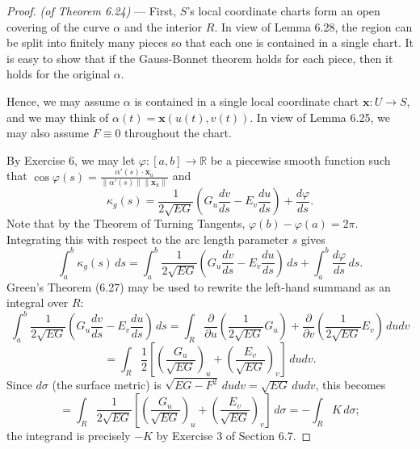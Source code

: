 \documentclass[leqno]{book}
\begin{document}
\begin{proof}
\emph{(of Theorem 6.24)} \---- First, $S$'s local coordinate charts form an open covering of the curve $\alpha$ and the interior $R$.  In view of Lemma 6.28, the region can be split into finitely many pieces so that each one is contained in a single chart.  It is easy to show that if the Gauss-Bonnet theorem holds for each piece, then it holds for the original $\alpha$.

Hence, we may assume $\alpha$ is contained in a single local coordinate chart $\mathbf x:U\to S$, and we may think of $\alpha(t)=\mathbf x(u(t),v(t))$.  In view of Lemma 6.25, we may also assume $F\equiv 0$ throughout the chart.

By Exercise 6, we may let $\varphi:[a,b]\to\mathbb R$ be a piecewise smooth function such that $\cos\varphi(s)=\frac{\alpha'(s)\cdot\mathbf x_u}{\|\alpha'(s)\|\|\mathbf x_u\|}$ and
$$\kappa_g(s)=\frac 1{2\sqrt{EG}}\left(G_u\frac{dv}{ds}-E_v\frac{du}{ds}\right)+\frac{d\varphi}{ds}.$$
Note that by the Theorem of Turning Tangents, $\varphi(b)-\varphi(a)=2\pi$.  Integrating this with respect to the arc length parameter $s$ gives
\begin{equation}\tag{*}\int_a^b\kappa_g(s)\,ds=\int_a^b\frac 1{2\sqrt{EG}}\left(G_u\frac{dv}{ds}-E_v\frac{du}{ds}\right)\,ds+\int_a^b\frac{d\varphi}{ds}\,ds.\end{equation}
Green's Theorem (6.27) may be used to rewrite the left-hand summand as an integral over $R$:
$$\int_a^b\frac 1{2\sqrt{EG}}\left(G_u\frac{dv}{ds}-E_v\frac{du}{ds}\right)\,ds=\int_R\frac{\partial}{\partial u}\left(\frac 1{2\sqrt{EG}}G_u\right)+\frac{\partial}{\partial v}\left(\frac 1{2\sqrt{EG}}E_v\right)\,dudv$$
$$=\int_R\frac 12\left[\left(\frac{G_u}{\sqrt{EG}}\right)_u+\left(\frac{E_v}{\sqrt{EG}}\right)_v\right]\,dudv.$$
Since $d\sigma$ (the surface metric) is $\sqrt{EG-F^2}\,dudv=\sqrt{EG}\,dudv$, this becomes
$$=\int_R\frac 1{2\sqrt{EG}}\left[\left(\frac{G_u}{\sqrt{EG}}\right)_u+\left(\frac{E_v}{\sqrt{EG}}\right)_v\right]\,d\sigma=-\int_RK\,d\sigma;$$
the integrand is precisely $-K$ by Exercise 3 of Section 6.7.


\end{proof}
\end{document}
